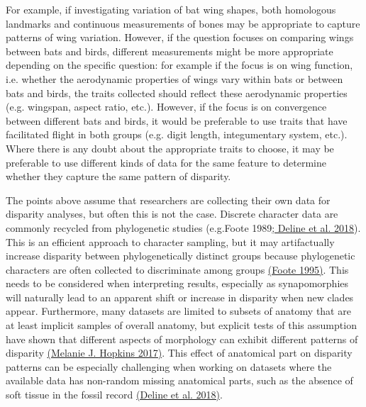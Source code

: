 For example, if investigating variation of bat wing shapes, both homologous landmarks and continuous measurements of bones may be appropriate to capture patterns of wing variation.
However, if the question focuses on comparing wings between bats and birds, different measurements might be more appropriate depending on the specific question: for example if the focus is on wing function, i.e. whether the aerodynamic properties of wings vary within bats or between bats and birds, the traits collected should reflect these aerodynamic properties (e.g. wingspan, aspect ratio, etc.).
However, if the focus is on convergence between different bats and birds, it would be preferable to use traits that have facilitated flight in both groups (e.g. digit length, integumentary system, etc.).
Where there is any doubt about the appropriate traits to choose, it may be preferable to use different kinds of data for the same feature to determine whether they capture the same pattern of disparity.

The points above assume that researchers are collecting their own data for disparity analyses, but often this is not the case.
Discrete character data are commonly recycled from phylogenetic studies (e.g.Foote 1989\href{https://paperpile.com/c/sTGYvp/2Neu+0y4V}{; Deline et al. 2018}).
This is an efficient approach to character sampling, but it may artifactually increase disparity between phylogenetically distinct groups because phylogenetic characters are often collected to discriminate among groups \href{https://paperpile.com/c/sTGYvp/fTJ3}{(Foote 1995)}.
This needs to be considered when interpreting results, especially as synapomorphies will naturally lead to an apparent shift or increase in disparity when new clades appear.
Furthermore, many datasets are limited to subsets of anatomy that are at least implicit samples of overall anatomy, but explicit tests of this assumption have shown that different aspects of morphology can exhibit different patterns of disparity \href{https://paperpile.com/c/sTGYvp/xLdm}{(Melanie J. Hopkins 2017)}.
This effect of anatomical part on disparity patterns can be especially challenging when working on datasets where the available data has non-random missing anatomical parts, such as the absence of soft tissue in the fossil record \href{https://paperpile.com/c/sTGYvp/0y4V}{(Deline et al. 2018)}.

